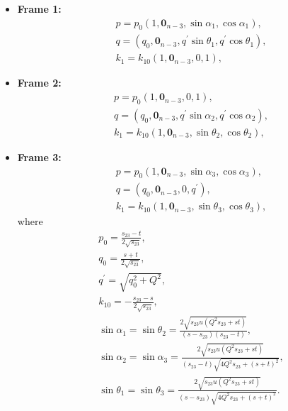 \documentclass[prd,preprintnumbers,nofootinbib,superscriptaddress,onecolumn,preprint]{revtex4-1}
\newcommand\3[1]{\boldsymbol{#1}}
\begin{document}
\begin{itemize}
	\item[] \textbf{Frame 1:}
	\begin{align}
	&p=p_0(1,\bm{0}_{n-3},\sin\alpha_1,\cos\alpha_1),\label{e.pf1} \\
	&q=(q_0,\bm{0}_{n-3},q^{\prime}\sin\theta_1,q^{\prime}\cos\theta_1)\label{e.qf1},\\
	&k_1=k_{10}(1,\bm{0}_{n-3},0,1)\label{e.k1f1},
	\end{align}
	\item[] \textbf{Frame 2:}
	\begin{align}
	&p=p_0(1,\bm{0}_{n-3},0,1)\label{e.pf2},\\
	&q=(q_0,\bm{0}_{n-3},q^{\prime}\sin\alpha_2,q^{\prime}\cos\alpha_2)\label{e.qf2},\\
	&k_1=k_{10}(1,\bm{0}_{n-3},\sin\theta_2,\cos\theta_2),\label{e.k1f2} 
	\end{align}
	\item[] \textbf{Frame 3:}
	\begin{align}
	&p=p_0(1,\bm{0}_{n-3},\sin\alpha_3,\cos\alpha_3),\label{e.pf3} \\
	&q=(q_0,\bm{0}_{n-3},0,q^{\prime})\label{e.qf3},\\
	&k_1=k_{10}(1,\bm{0}_{n-3},\sin\theta_3,\cos\theta_3),\label{e.k1f3} 
	\end{align}
	where
	\begin{align}
	&p_0=\frac{s_{23}-t}{2\sqrt{s_{23}}}, \\
	&q_0=\frac{s+t}{2\sqrt{s_{23}}}, \\
	&q^{\prime}=\sqrt{q_0^2+Q^2}, \\
	&k_{10}=-\frac{s_{23}-s}{2\sqrt{s_{23}}}, \\
	&\sin\alpha_1=\sin\theta_2
	=\frac{2\sqrt{s_{23}u(Q^2s_{23}+st)}}{(s-s_{23})(s_{23}-t)},\\
	&\sin\alpha_2=\sin\alpha_3
	=\frac{2\sqrt{s_{23}u(Q^2s_{23}+st)}}{(s_{23}-t)\sqrt{4Q^2s_{23}+(s+t)^2}},\\
	&\sin\theta_1=\sin\theta_3
	=\frac{2\sqrt{s_{23}u(Q^2s_{23}+st)}}{(s-s_{23})\sqrt{4Q^2s_{23}+(s+t)^2}}.
	\end{align}
\end{itemize}
\end{document}
